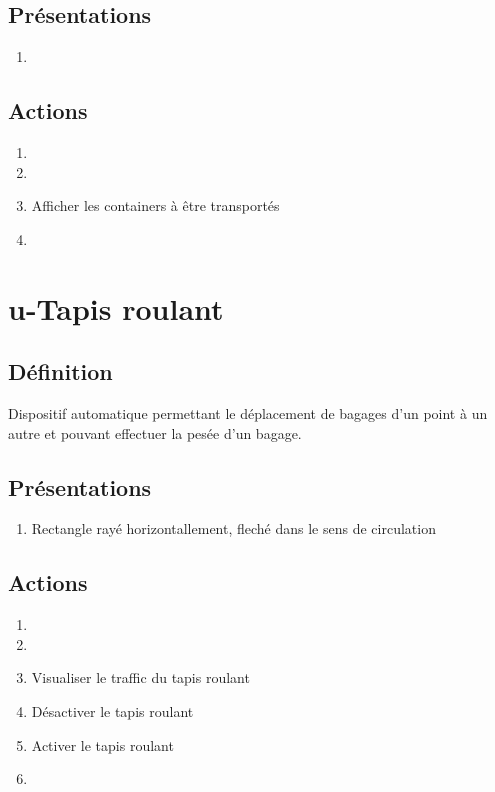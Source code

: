 \subsection{Présentations}
\begin{enumerate}
	\item \rectetiquette
\end{enumerate}

\subsection{Actions}
\begin{enumerate}
	\item {}
	\item {}
	\item Afficher les containers à être transportés
	\item \transit
\end{enumerate}

\section{u-Tapis roulant}
\subsection{Définition}
	Dispositif automatique permettant le déplacement de bagages d'un point à un autre et pouvant effectuer la pesée d'un
	bagage.

\subsection{Présentations}
\begin{enumerate}
	\item Rectangle rayé horizontallement, fleché dans le sens de circulation
\end{enumerate}

\subsection{Actions}
\begin{enumerate}
	\item {}
	\item {}
	\item Visualiser le traffic du tapis roulant
	\item Désactiver le tapis roulant
	\item Activer le tapis roulant
	\item \etat
\end{enumerate}

